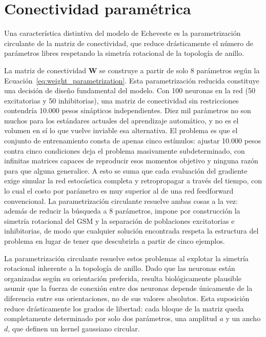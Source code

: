 
\section{Conectividad paramétrica}
\label{sec:impl_conectividad}

Una característica distintiva del modelo de Echeveste es la parametrización circulante de la matriz de conectividad, que reduce drásticamente el número de parámetros libres respetando la simetría rotacional de la topología de anillo.

La matriz de conectividad $\mathbf{W}$ se construye a partir de solo 8 parámetros según la Ecuación~\ref{eq:weight_parametrization}. Esta parametrización reducida constituye una decisión de diseño fundamental del modelo. Con 100 neuronas en la red (50 excitatorias y 50 inhibitorias), una matriz de conectividad sin restricciones contendría 10.000 pesos sinápticos independientes. Diez mil parámetros no son muchos para los estándares actuales del aprendizaje automático, y no es el volumen en sí lo que vuelve inviable esa alternativa. El problema es que el conjunto de entrenamiento consta de apenas cinco estímulos: ajustar 10.000 pesos contra cinco condiciones deja el problema masivamente subdeterminado, con infinitas matrices capaces de reproducir esos momentos objetivo y ninguna razón para que alguna generalice. A esto se suma que cada evaluación del gradiente exige simular la red estocástica completa y retropropagar a través del tiempo, con lo cual el costo por parámetro es muy superior al de una red feedforward convencional. La parametrización circulante resuelve ambas cosas a la vez: además de reducir la búsqueda a 8 parámetros, impone por construcción la simetría rotacional del \acrshort{GSM} y la separación de poblaciones excitatorias e inhibitorias, de modo que cualquier solución encontrada respeta la estructura del problema en lugar de tener que descubrirla a partir de cinco ejemplos.

La parametrización circulante resuelve estos problemas al explotar la simetría rotacional inherente a la topología de anillo. Dado que las neuronas están organizadas según su orientación preferida, resulta biológicamente plausible asumir que la fuerza de conexión entre dos neuronas depende únicamente de la diferencia entre sus orientaciones, no de sus valores absolutos. Esta suposición reduce drásticamente los grados de libertad: cada bloque de la matriz queda completamente determinado por solo dos parámetros, una amplitud $a$ y un ancho $d$, que definen un kernel gaussiano circular.

